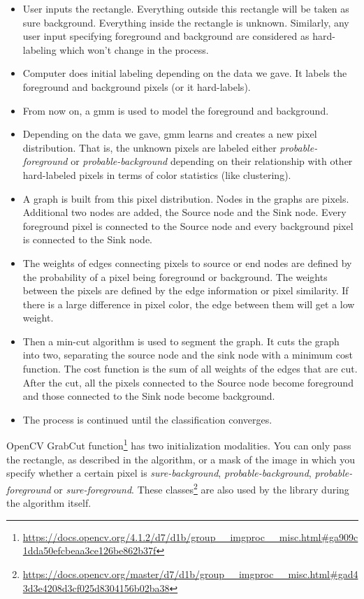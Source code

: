 \begin{itemize}
	\item User inputs the rectangle. Everything outside this rectangle will be taken as sure background. Everything inside the rectangle is unknown. Similarly, any user input specifying foreground and background are considered as hard-labeling which won't change in the process.
	\item Computer does initial labeling depending on the data we gave. It labels the foreground and background pixels (or it hard-labels).
	\item From now on, a \gls{gmm} is used to model the foreground and background.
	\item Depending on the data we gave, \gls{gmm} learns and creates a new pixel distribution. That is, the unknown pixels are labeled either \textit{probable-foreground} or \textit{probable-background} depending on their relationship with other hard-labeled pixels in terms of color statistics (like clustering).
	\item A graph is built from this pixel distribution. Nodes in the graphs are pixels. Additional two nodes are added, the Source node and the Sink node. Every foreground pixel is connected to the Source node and every background pixel is connected to the Sink node.
	\item The weights of edges connecting pixels to source or end nodes are defined by the probability of a pixel being foreground or background. The weights between the pixels are defined by the edge information or pixel similarity. If there is a large difference in pixel color, the edge between them will get a low weight.
	\item Then a min-cut algorithm is used to segment the graph. It cuts the graph into two, separating the source node and the sink node with a minimum cost function. The cost function is the sum of all weights of the edges that are cut. After the cut, all the pixels connected to the Source node become foreground and those connected to the Sink node become background.
	\item The process is continued until the classification converges.
\end{itemize}


OpenCV GrabCut function\footnote{\url{https://docs.opencv.org/4.1.2/d7/d1b/group__imgproc__misc.html\#ga909c1dda50efcbeaa3ce126be862b37f}} has two initialization modalities. You can only pass the rectangle, as described in the algorithm, or a mask of the image in which you specify whether a certain pixel is \textit{sure-background}, \textit{probable-background}, \textit{probable-foreground} or \textit{sure-foreground}. These classes\footnote{\url{https://docs.opencv.org/master/d7/d1b/group__imgproc__misc.html\#gad43d3e4208d3cf025d8304156b02ba38}} are also used by the library during the algorithm itself. 

